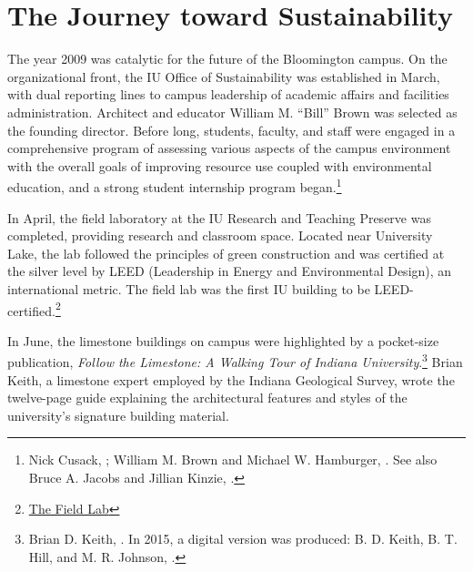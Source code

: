 \documentclass[
  american,
  letterpaper,
]{scrreprt}
\begin{document}
\section{The Journey toward
Sustainability}\label{the-journey-toward-sustainability}

The year 2009 was catalytic for the future of the Bloomington campus. On
the organizational front, the IU Office of Sustainability was
established in March, with dual reporting lines to campus leadership of
academic affairs and facilities administration. Architect and educator
William M. ``Bill'' Brown was selected as the founding director. Before
long, students, faculty, and staff were engaged in a comprehensive
program of assessing various aspects of the campus environment with the
overall goals of improving resource use coupled with environmental
education, and a strong student internship program began.\footnote{Nick
  Cusack, ; William M.
  Brown and Michael W. Hamburger,
  . See also Bruce A. Jacobs and Jillian Kinzie,
  .}

In April, the field laboratory at the IU Research and Teaching Preserve
was completed, providing research and classroom space. Located near
University Lake, the lab followed the principles of green construction
and was certified at the silver level by LEED (Leadership in Energy and
Environmental Design), an international metric. The field lab was the
first IU building to be LEED-certified.\footnote{\href{https://preserve.indiana.edu/about/field-lab.html}{The
  Field Lab}}

In June, the limestone buildings on campus were highlighted by a
pocket-size publication, \emph{Follow the Limestone: A Walking Tour of
Indiana University}.\footnote{Brian D. Keith,
  . In 2015, a digital version was produced: B. D. Keith, B. T.
  Hill, and M. R. Johnson, .}
Brian Keith, a limestone expert employed by the Indiana Geological
Survey, wrote the twelve-page guide explaining the architectural
features and styles of the university's signature building material.
\end{document}
